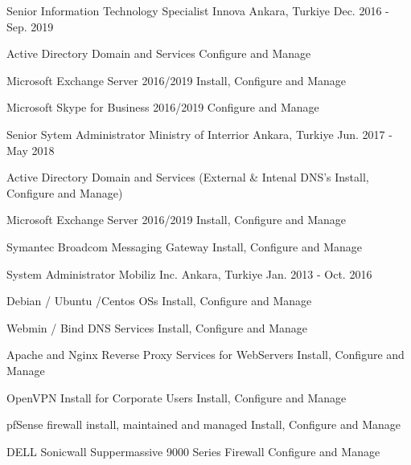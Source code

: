 \begin{cventries}
  \cventry
    {Senior Information Technology Specialist} %
    {Innova} %
    {Ankara, Turkiye} %
    {Dec. 2016 - Sep. 2019} %
    {
      \begin{cvitems} %
        \item {Active Directory Domain and Services Configure and Manage}
        \item {Microsoft Exchange Server 2016/2019 Install, Configure and Manage}
        \item {Microsoft Skype for Business 2016/2019 Configure and Manage}
      \end{cvitems}
    }
  \cventry
    {Senior Sytem Administrator} %
    {Ministry of Interrior} %
    {Ankara, Turkiye} %
    {Jun. 2017 - May 2018} %
    {
      \begin{cvitems} %
        \item {Active Directory Domain and Services (External \& Intenal DNS's Install, Configure and Manage)}
        \item {Microsoft Exchange Server 2016/2019 Install, Configure and Manage}
        \item {Symantec Broadcom Messaging Gateway Install, Configure and Manage}
      \end{cvitems}
    }
  \cventry
    {System Administrator} %
    {Mobiliz Inc.} %
    {Ankara, Turkiye} %
    {Jan. 2013 - Oct. 2016} %
    {
      \begin{cvitems} %
        \item {Debian / Ubuntu /Centos OSs Install, Configure and Manage}
        \item {Webmin / Bind DNS Services Install, Configure and Manage}
        \item {Apache and Nginx Reverse Proxy Services for WebServers Install, Configure and Manage}
        \item {OpenVPN Install for Corporate Users Install, Configure and Manage}
        \item {pfSense firewall install, maintained and managed Install, Configure and Manage}
        \item {DELL Sonicwall Suppermassive 9000 Series Firewall Configure and Manage}

\end{cvitems}}
\end{cventries}
